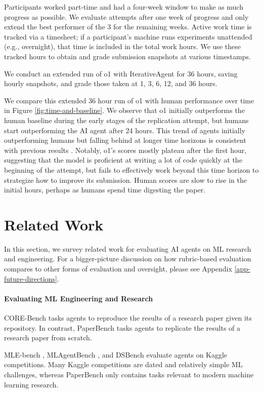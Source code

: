\documentclass{article}
\theoremstyle{plain}
\theoremstyle{definition}
\theoremstyle{remark}
\begin{document}
Participants worked part-time and had a four-week window to make as much progress as possible. We evaluate attempts after one week of progress and only extend the best performer of the 3 for the remaining weeks. Active work time is tracked via a timesheet; if a participant’s machine runs experiments unattended (e.g., overnight), that time is included in the total work hours. We use these tracked hours to obtain and grade submission snapshots at various timestamps.

We conduct an extended run of o1 with IterativeAgent for 36 hours, saving hourly snapshots, and grade those taken at 1, 3, 6, 12, and 36 hours.

We compare this extended 36 hour run of o1 with human performance over time in Figure \ref{fig:time-and-baseline}. We observe that o1 initially outperforms the human baseline during the early stages of the replication attempt, but humans start outperforming the AI agent after 24 hours. This trend of agents initially outperforming humans but falling behind at longer time horizons is consistent with previous results \citet{wijk2024re}. Notably, o1's scores mostly plateau after the first hour, suggesting that the model is proficient at writing a lot of code quickly at the beginning of the attempt, but fails to effectively work beyond this time horizon to strategize how to improve its submission. Human scores are slow to rise in the initial hours, perhaps as humans spend time digesting the paper.


\section{Related Work}

In this section, we survey related work for evaluating AI agents on ML research and engineering. For a bigger-picture discussion on how rubric-based evaluation compares to other forms of evaluation and oversight, please see Appendix \ref{app-future-directions}.

\paragraph{Evaluating ML Engineering and Research} CORE-Bench \citep{siegel2024core} tasks agents to reproduce the results of a research paper given its repository. In contrast, PaperBench tasks agents to replicate the results of a research paper from scratch.

MLE-bench \citep{chan2024mle}, MLAgentBench \citep{huang2024mlagentbench}, and DSBench \citep{jing2024dsbench} evaluate agents on Kaggle competitions. Many Kaggle competitions are dated and relatively simple ML challenges, whereas PaperBench only contains tasks relevant to modern machine learning research.
\end{document}
